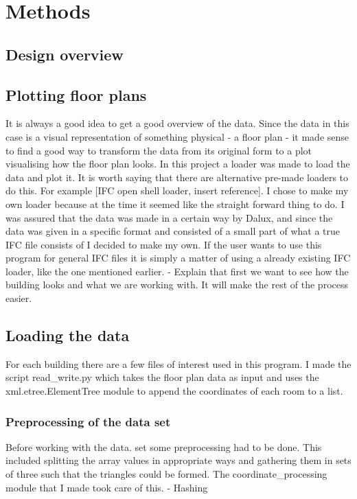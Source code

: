 \section{Methods}
\subsection{Design overview}

\subsection{Plotting floor plans}
It is always a good idea to get a good overview of the data. Since the data in this case is a visual representation of something physical - a floor plan - it made sense 
to find a good way to transform the data from its original form to a plot visualising how the floor plan looks. 
In this project a loader was made to load the data and plot it. It is worth saying that there are alternative pre-made loaders to do this. For example [IFC open shell loader, insert reference]. I chose to make my own loader because at the time it seemed like the straight forward thing to do. I was assured that the data was made in a certain way by Dalux, and since the data was given in a specific format and consisted of a small part of what a true IFC file consists of I decided to make my own. If the user wants to use this program for general IFC files it is simply a matter of using a already existing IFC loader, like the one mentioned earlier.
- Explain that first we want to see how the building looks and what we are working with. It will make the rest of the process easier.
\subsection{Loading the data}
For each building there are a few files of interest used in this program.
I made the script read\_write.py which takes the floor plan data as input and uses the xml.etree.ElementTree module to append the coordinates of each room to a list.
\subsubsection{Preprocessing of the data set}
Before working with the data. set some preprocessing had to be done. This included splitting the array values in appropriate ways and gathering them in sets of three such that the triangles could be formed. The coordinate\_processing module that I made took care of this.
- Hashing
